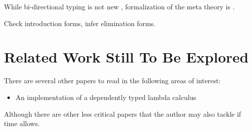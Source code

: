 While bi-directional typing is not new
\cite{DBLP:journals/toplas/PierceT00}, formalization of the meta
theory is \cite{TypesWhoSayNi}. 

Check introduction forms, infer elimination forms.

\section{Related Work Still To Be Explored}

There are several other papers to read in the following
areas of interest:

\begin{itemize}
\item An implementation of a dependently typed lambda
  calculus \cite{ATutorialImplementationOfDTLC}
\end{itemize}

Although there are other less critical papers that the
author may also tackle if time allows.
